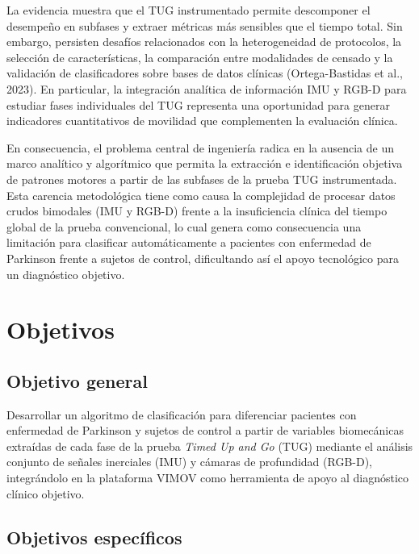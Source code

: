 \documentclass[12pt,a4paper]{article}
\begin{document}
La evidencia muestra que el TUG instrumentado permite descomponer el desempeño en subfases y extraer métricas más sensibles que el tiempo total. Sin embargo, persisten desafíos relacionados con la heterogeneidad de protocolos, la selección de características, la comparación entre modalidades de censado y la validación de clasificadores sobre bases de datos clínicas (Ortega-Bastidas et al., 2023). En particular, la integración analítica de información IMU y RGB-D para estudiar fases individuales del TUG representa una oportunidad para generar indicadores cuantitativos de movilidad que complementen la evaluación clínica.

En consecuencia, el problema central de ingeniería radica en la ausencia de un marco analítico y algorítmico que permita la extracción e identificación objetiva de patrones motores a partir de las subfases de la prueba TUG instrumentada. Esta carencia metodológica tiene como causa la complejidad de procesar datos crudos bimodales (IMU y RGB-D) frente a la insuficiencia clínica del tiempo global de la prueba convencional, lo cual genera como consecuencia una limitación para clasificar automáticamente a pacientes con enfermedad de Parkinson frente a sujetos de control, dificultando así el apoyo tecnológico para un diagnóstico objetivo.

\section{Objetivos}\label{sec:objetivos}

\subsection{Objetivo general}\label{sec:objetivo-general}

Desarrollar un algoritmo de clasificación para diferenciar pacientes con enfermedad de Parkinson y sujetos de control a partir de variables biomecánicas extraídas de cada fase de la prueba \textit{Timed Up and Go} (TUG) mediante el análisis conjunto de señales inerciales (IMU) y cámaras de profundidad (RGB-D), integrándolo en la plataforma VIMOV como herramienta de apoyo al diagnóstico clínico objetivo.

\subsection{Objetivos específicos}\label{sec:objetivos-especificos}
\end{document}
